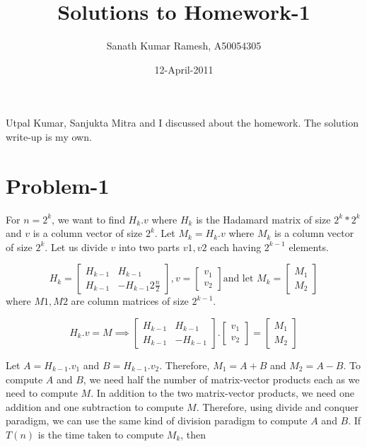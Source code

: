 \documentclass{article}
\begin{document}
\title{Solutions to Homework-1}
\author{Sanath Kumar Ramesh, A50054305}
\date{12-April-2011}
\maketitle

Utpal Kumar, Sanjukta Mitra and I discussed about the homework. The solution write-up is my own.

\section{Problem-1}
For $n=2^{k}$, we want to find $H_{k}.v$ where $H_{k}$ is the Hadamard matrix of size $2^{k}*2^{k}$ and $v$ is a column vector of size $2^{k}$. Let $M_k = H_{k}.v$ where $M_k$ is a column vector of size $2^{k}$. Let us divide $v$ into two parts $v1,v2$ each having $2^{k-1}$ elements.


\[
H_{k} =
 \begin{bmatrix}
	H_{k-1} & H_{k-1} \\
	H_{k-1} & -H_{k-1} 2\frac{n}{2}
 \end{bmatrix} ,
v = 
  \begin{bmatrix}
		v_1 \\
		v_2 
  \end{bmatrix}
\text{and let } 
M_k =
  \begin{bmatrix}
		M_1 \\
		M_2
  \end{bmatrix}
\]
where $M1, M2$ are column matrices of size $2^{k-1}$.

\[
H_{k}.v = M
\implies
 \begin{bmatrix}
	H_{k-1} & H_{k-1} \\
	H_{k-1} & -H_{k-1} 
 \end{bmatrix} .
  \begin{bmatrix}
		v_1 \\
		v_2 
  \end{bmatrix} =
  \begin{bmatrix}
		M_1 \\
		M_2
  \end{bmatrix}
\]

Let $A = H_{k-1}.v_1$  and $B=H_{k-1}.v_2$. Therefore, $M_1 = A + B$ and $M_2= A - B$. To compute $A$ and $B$, we need half the number of matrix-vector products each as we need to compute $M$. In addition to the two matrix-vector products, we need one addition and one subtraction to compute $M$. Therefore, using divide and conquer paradigm, we can use the same kind of division paradigm to compute $A$ and $B$. If $T(n)$ is the time taken to compute $M_k$, then 
\end{document}
